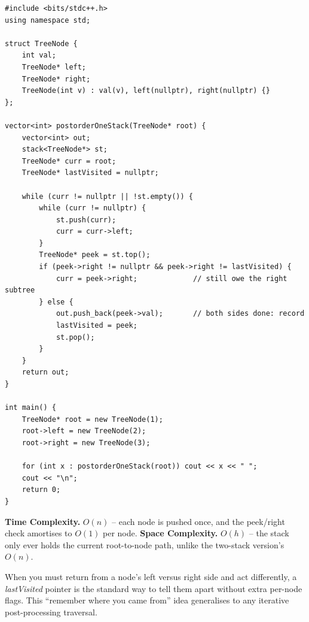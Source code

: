 \begin{lstlisting}
#include <bits/stdc++.h>
using namespace std;

struct TreeNode {
    int val;
    TreeNode* left;
    TreeNode* right;
    TreeNode(int v) : val(v), left(nullptr), right(nullptr) {}
};

vector<int> postorderOneStack(TreeNode* root) {
    vector<int> out;
    stack<TreeNode*> st;
    TreeNode* curr = root;
    TreeNode* lastVisited = nullptr;

    while (curr != nullptr || !st.empty()) {
        while (curr != nullptr) {
            st.push(curr);
            curr = curr->left;
        }
        TreeNode* peek = st.top();
        if (peek->right != nullptr && peek->right != lastVisited) {
            curr = peek->right;             // still owe the right subtree
        } else {
            out.push_back(peek->val);       // both sides done: record
            lastVisited = peek;
            st.pop();
        }
    }
    return out;
}

int main() {
    TreeNode* root = new TreeNode(1);
    root->left = new TreeNode(2);
    root->right = new TreeNode(3);

    for (int x : postorderOneStack(root)) cout << x << " ";
    cout << "\n";
    return 0;
}
\end{lstlisting}

\begin{complexitybox}
\textbf{Time Complexity.} $O(n)$ -- each node is pushed once, and the
peek/right check amortises to $O(1)$ per node. \textbf{Space Complexity.}
$O(h)$ -- the stack only ever holds the current root-to-node path, unlike
the two-stack version's $O(n)$.
\end{complexitybox}

\begin{takeawaybox}
When you must return from a node's left versus right side and act
differently, a \textit{lastVisited} pointer is the standard way to tell
them apart without extra per-node flags. This ``remember where you came
from'' idea generalises to any iterative post-processing traversal.
\end{takeawaybox}
